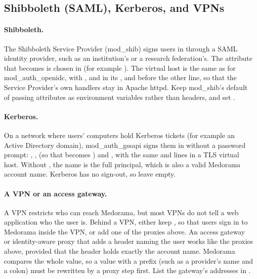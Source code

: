 \subsection{Shibboleth (SAML), Kerberos, and VPNs}
\label{sec:sign-in-other-proxies}

\paragraph{Shibboleth.} The Shibboleth Service Provider (mod\_shib) signs users in through a SAML
identity provider, such as an institution's or a research federation's. The attribute that
becomes  is chosen in  (for example ). The
virtual host is the same as for mod\_auth\_openidc, with ,
 and  in its
, and  before the other 
line, so that the Service Provider's own handlers stay in Apache httpd. Keep mod\_shib's default
of passing attributes as environment variables rather than headers, and set
.

\paragraph{Kerberos.} On a network where users' computers hold Kerberos tickets (for example an
Active Directory domain), mod\_auth\_gssapi signs them in without a password prompt:
, ,
 (so that  becomes ) and
, with the same  and  lines in a TLS
virtual host. Without , the name is the full principal, which is also a
valid Medorama account name. Kerberos has no sign-out, so leave  empty.

\paragraph{A VPN or an access gateway.} A VPN restricts who can reach Medorama, but most VPNs do
not tell a web application who the user is. Behind a VPN, either keep
, so that users sign in to Medorama inside the VPN, or add one of the
proxies above. An access gateway or identity-aware proxy that adds a header naming the user works
like the proxies above, provided that the header holds exactly the account name. Medorama
compares the whole value, so a value with a prefix (such as a provider's name and a colon) must
be rewritten by a proxy step first. List the gateway's addresses in .

